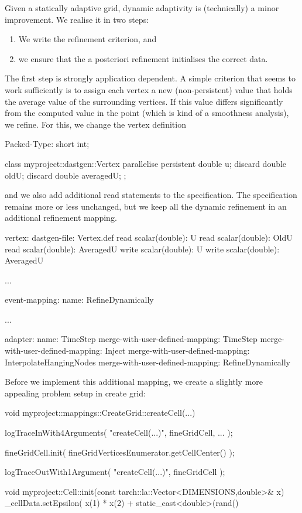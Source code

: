 Given a statically adaptive grid, dynamic adaptivity is (technically) a minor
improvement. 
We realise it in two steps:
\begin{enumerate}
  \item We write the refinement criterion, and 
  \item we ensure that the a posteriori refinement initialises the correct data.
\end{enumerate}

The first step is strongly application dependent. 
A simple criterion that seems to work sufficiently is to assign each vertex a
new (non-persistent) value that holds the average value of the surrounding
vertices. 
If this value differs significantly from the computed value in the point (which
is kind of a smoothness analysis), we refine.
For this, we change the vertex definition
\begin{code}
Packed-Type: short int;


class myproject::dastgen::Vertex {  
  parallelise persistent double  u;
  discard    double  oldU;
  discard    double  averagedU;
};
\end{code}

\noindent
and we also add additional read statements to the specification.
The specification remains more or less unchanged, but we keep all the dynamic
refinement in an additional refinement mapping.

\begin{code}
vertex:
  dastgen-file: Vertex.def
  read scalar(double): U
  read scalar(double): OldU
  read scalar(double): AveragedU
  write scalar(double): U
  write scalar(double): AveragedU
  
...

event-mapping:
  name: RefineDynamically

...

adapter:
  name: TimeStep
  merge-with-user-defined-mapping: TimeStep
  merge-with-user-defined-mapping: Inject
  merge-with-user-defined-mapping: InterpolateHangingNodes
  merge-with-user-defined-mapping: RefineDynamically
\end{code}

\noindent
Before we implement this additional mapping, we create a slightly more appealing
problem setup in create grid:
\begin{code}
void myproject::mappings::CreateGrid::createCell(...) {
  logTraceInWith4Arguments( "createCell(...)", fineGridCell, ... );

  fineGridCell.init( fineGridVerticesEnumerator.getCellCenter() );

  logTraceOutWith1Argument( "createCell(...)", fineGridCell );
}


void myproject::Cell::init(const tarch::la::Vector<DIMENSIONS,double>&  x) {
  _cellData.setEpsilon( x(1) * x(2) + static_cast<double>(rand() %
}
\end{code}

